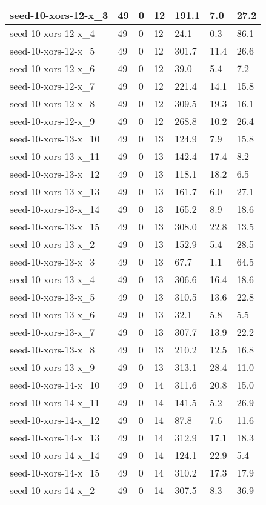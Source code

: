 \begin{scriptsize}
\begin{longtable}{|p{5cm}|l|l|l|l|l|l|}
seed-10-xors-12-x\_3&49&0&12&191.1&7.0&27.2 \\ \hline 
seed-10-xors-12-x\_4&49&0&12&24.1&0.3&86.1 \\ \hline 
seed-10-xors-12-x\_5&49&0&12&301.7&11.4&26.6 \\ \hline 
seed-10-xors-12-x\_6&49&0&12&39.0&5.4&7.2 \\ \hline 
seed-10-xors-12-x\_7&49&0&12&221.4&14.1&15.8 \\ \hline 
seed-10-xors-12-x\_8&49&0&12&309.5&19.3&16.1 \\ \hline 
seed-10-xors-12-x\_9&49&0&12&268.8&10.2&26.4 \\ \hline 
seed-10-xors-13-x\_10&49&0&13&124.9&7.9&15.8 \\ \hline 
seed-10-xors-13-x\_11&49&0&13&142.4&17.4&8.2 \\ \hline 
seed-10-xors-13-x\_12&49&0&13&118.1&18.2&6.5 \\ \hline 
seed-10-xors-13-x\_13&49&0&13&161.7&6.0&27.1 \\ \hline 
seed-10-xors-13-x\_14&49&0&13&165.2&8.9&18.6 \\ \hline 
seed-10-xors-13-x\_15&49&0&13&308.0&22.8&13.5 \\ \hline 
seed-10-xors-13-x\_2&49&0&13&152.9&5.4&28.5 \\ \hline 
seed-10-xors-13-x\_3&49&0&13&67.7&1.1&64.5 \\ \hline 
seed-10-xors-13-x\_4&49&0&13&306.6&16.4&18.6 \\ \hline 
seed-10-xors-13-x\_5&49&0&13&310.5&13.6&22.8 \\ \hline 
seed-10-xors-13-x\_6&49&0&13&32.1&5.8&5.5 \\ \hline 
seed-10-xors-13-x\_7&49&0&13&307.7&13.9&22.2 \\ \hline 
seed-10-xors-13-x\_8&49&0&13&210.2&12.5&16.8 \\ \hline 
seed-10-xors-13-x\_9&49&0&13&313.1&28.4&11.0 \\ \hline 
seed-10-xors-14-x\_10&49&0&14&311.6&20.8&15.0 \\ \hline 
seed-10-xors-14-x\_11&49&0&14&141.5&5.2&26.9 \\ \hline 
seed-10-xors-14-x\_12&49&0&14&87.8&7.6&11.6 \\ \hline 
seed-10-xors-14-x\_13&49&0&14&312.9&17.1&18.3 \\ \hline 
seed-10-xors-14-x\_14&49&0&14&124.1&22.9&5.4 \\ \hline 
seed-10-xors-14-x\_15&49&0&14&310.2&17.3&17.9 \\ \hline 
seed-10-xors-14-x\_2&49&0&14&307.5&8.3&36.9 \\ \hline 

\end{longtable}
\end{scriptsize}
